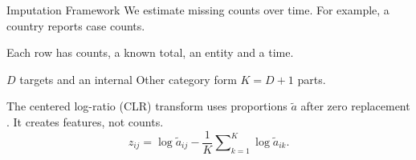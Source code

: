 \begin{frame}{Imputation Framework}
\TightMath
We estimate missing counts over time. For example, a country reports case counts.
\begin{KeyPoints}
\item Each row has counts, a known total, an entity and a time.
\item $D$ targets and an internal Other category form $K=D+1$ parts.
\end{KeyPoints}
The centered log-ratio (CLR) transform uses proportions $\widetilde a$ after zero replacement . It creates features, not counts.
\[
z_{ij}=\log\widetilde a_{ij}-\frac1K\sum\nolimits_{k=1}^K\log\widetilde a_{ik}.
\]
\end{frame}

